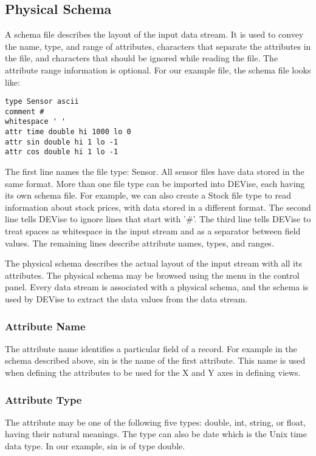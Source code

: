 \subsection{Physical Schema}

A schema file describes the layout of the input data stream. It is
used to convey the name, type, and range of attributes, characters
that separate the attributes in the file, and characters that should
be ignored while reading the file. The attribute range information is
optional. For our example file, the schema file looks like:

\begin{verbatim}
type Sensor ascii
comment #
whitespace ' '
attr time double hi 1000 lo 0
attr sin double hi 1 lo -1
attr cos double hi 1 lo -1
\end{verbatim}

The first line names the file type: Sensor. All sensor files have data
stored in the same format. More than one file type can be imported
into DEVise, each having its own schema file. For example, we can
also create a Stock file type to read information about stock prices,
with data stored in a different format. The second line tells DEVise
to ignore lines that start with '\#'. The third line tells DEVise to
treat spaces as whitespace in the input stream and as a separator
between field values. The remaining lines describe attribute names,
types, and ranges.

The physical schema describes the actual layout of the input stream
with all its attributes. The physical schema may be browsed using the
 menu in the control panel. Every data stream is
associated with a physical schema, and the schema is used by DEVise
to extract the data values from the data stream.

\subsubsection{Attribute Name}

The attribute name identifies a particular field of a record. For
example in the schema described above, sin is the name of the first
attribute. This name is used when defining the attributes to be used
for the X and Y axes in defining views.

\subsubsection{Attribute Type}

The attribute may be one of the following five types: double, int,
string, or float, having their natural meanings. The type can also be
date which is the Unix time data type. In our example, sin is of type
double.

